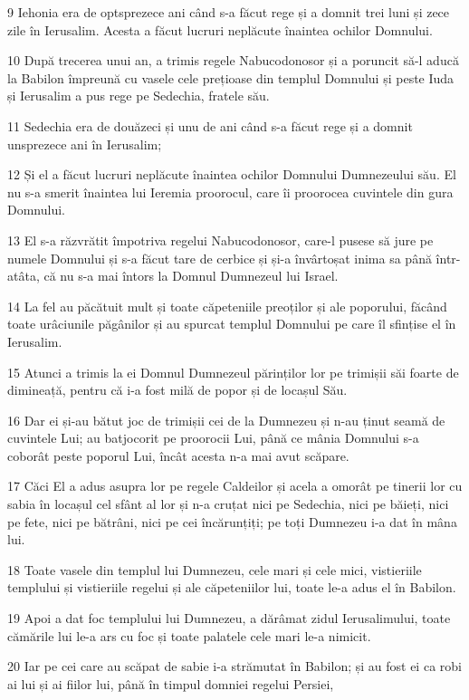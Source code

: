 \par 9 Iehonia era de optsprezece ani când s-a făcut rege și a domnit trei luni și zece zile în Ierusalim. Acesta a făcut lucruri neplăcute înaintea ochilor Domnului.
\par 10 După trecerea unui an, a trimis regele Nabucodonosor și a poruncit să-l aducă la Babilon împreună cu vasele cele prețioase din templul Domnului și peste Iuda și Ierusalim a pus rege pe Sedechia, fratele său.
\par 11 Sedechia era de douăzeci și unu de ani când s-a făcut rege și a domnit unsprezece ani în Ierusalim;
\par 12 Și el a făcut lucruri neplăcute înaintea ochilor Domnului Dumnezeului său. El nu s-a smerit înaintea lui Ieremia proorocul, care îi proorocea cuvintele din gura Domnului.
\par 13 El s-a răzvrătit împotriva regelui Nabucodonosor, care-l pusese să jure pe numele Domnului și s-a făcut tare de cerbice și și-a învârtoșat inima sa până într-atâta, că nu s-a mai întors la Domnul Dumnezeul lui Israel.
\par 14 La fel au păcătuit mult și toate căpeteniile preoților și ale poporului, făcând toate urâciunile păgânilor și au spurcat templul Domnului pe care îl sfințise el în Ierusalim.
\par 15 Atunci a trimis la ei Domnul Dumnezeul părinților lor pe trimișii săi foarte de dimineață, pentru că i-a fost milă de popor și de locașul Său.
\par 16 Dar ei și-au bătut joc de trimișii cei de la Dumnezeu și n-au ținut seamă de cuvintele Lui; au batjocorit pe proorocii Lui, până ce mânia Domnului s-a coborât peste poporul Lui, încât acesta n-a mai avut scăpare.
\par 17 Căci El a adus asupra lor pe regele Caldeilor și acela a omorât pe tinerii lor cu sabia în locașul cel sfânt al lor și n-a cruțat nici pe Sedechia, nici pe băieți, nici pe fete, nici pe bătrâni, nici pe cei încărunțiți; pe toți Dumnezeu i-a dat în mâna lui.
\par 18 Toate vasele din templul lui Dumnezeu, cele mari și cele mici, vistieriile templului și vistieriile regelui și ale căpeteniilor lui, toate le-a adus el în Babilon.
\par 19 Apoi a dat foc templului lui Dumnezeu, a dărâmat zidul Ierusalimului, toate cămările lui le-a ars cu foc și toate palatele cele mari le-a nimicit.
\par 20 Iar pe cei care au scăpat de sabie i-a strămutat în Babilon; și au fost ei ca robi ai lui și ai fiilor lui, până în timpul domniei regelui Persiei,
